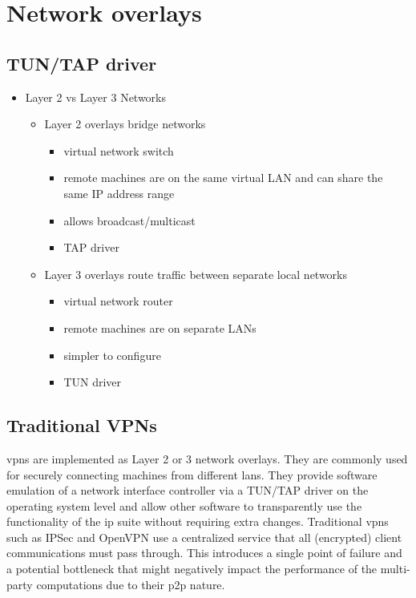 \hypertarget{network-overlays}{%
\section{Network overlays}\label{network-overlays}}

\hypertarget{tuntap-driver}{%
\subsection{TUN/TAP driver}\label{tuntap-driver}}

\begin{itemize}
\tightlist
\item
  Layer 2 vs Layer 3 Networks

  \begin{itemize}
  \tightlist
  \item
    Layer 2 overlays bridge networks

    \begin{itemize}
    \tightlist
    \item
      virtual network switch
    \item
      remote machines are on the same virtual LAN and can share the same
      IP address range
    \item
      allows broadcast/multicast
    \item
      TAP driver
    \end{itemize}
  \item
    Layer 3 overlays route traffic between separate local networks

    \begin{itemize}
    \tightlist
    \item
      virtual network router
    \item
      remote machines are on separate LANs
    \item
      simpler to configure
    \item
      TUN driver
    \end{itemize}
  \end{itemize}
\end{itemize}

\hypertarget{traditional-vpns}{%
\subsection{Traditional VPNs}\label{traditional-vpns}}

\glspl{vpn} are implemented as Layer 2 or 3 network overlays. They are
commonly used for securely connecting machines from different
\glspl{lan}. They provide software emulation of a network interface
controller via a TUN/TAP driver on the operating system level and allow
other software to transparently use the functionality of the \gls{ip}
suite without requiring extra changes. Traditional \glspl{vpn} such as
IPSec\autocite{ipSecDocs} and OpenVPN\autocite{openVPNDocs} use a
centralized service that all (encrypted) client communications must pass
through. This introduces a single point of failure and a potential
bottleneck that might negatively impact the performance of the
multi-party computations due to their \gls{p2p} nature.

